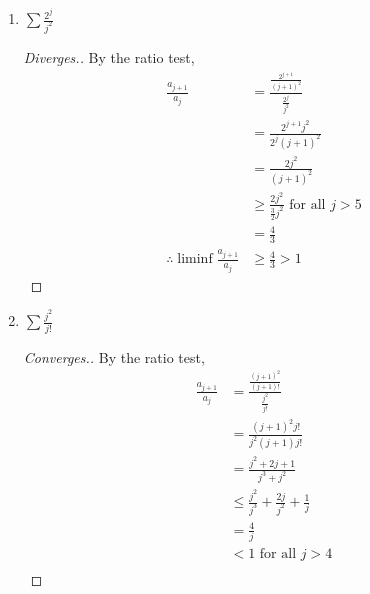 \documentclass{article}
\begin{document}
\begin{enumerate}
\begin{enumerate}
                  \item $\sum\frac{2^j}{j^2}$
                        \begin{proof}[Diverges.]
                              By the ratio test,
                              \begin{align*}
                                    \frac{a_{j+1}}{a_j}                    & = \frac{\frac{2^{j+1}}{(j+1)^2}}{\frac{2^j}{j^2}}        \\
                                                                           & = \frac{2^{j+1}j^2}{2^j(j+1)^2}                          \\
                                                                           & = \frac{2j^2}{(j+1)^2}                                   \\
                                                                           & \geq \frac{2j^2}{\frac{3}{2}j^2} \textrm{ for all $j>5$} \\
                                                                           & = \frac{4}{3}                                            \\
                                    \therefore \liminf \frac{a_{j+1}}{a_j} & \geq \frac{4}{3} > 1
                              \end{align*}
                        \end{proof}
                  \item $\sum\frac{j^2}{j!}$
                        \begin{proof}[Converges.]
                              By the ratio test,
                              \begin{align*}
                                    \frac{a_{j+1}}{a_j}                  & = \frac{\frac{(j+1)^2}{(j+1)!}}{\frac{j^2}{j!}} \\
                                                                         & = \frac{(j+1)^2j!}{j^2(j+1)j!}                  \\
                                                                         & = \frac{j^2+2j+1}{j^3+j^2}                      \\
                                                                         & \leq \frac{j^2}{j^3}+\frac{2j}{j^2}+\frac{1}{j} \\
                                                                         & = \frac{4}{j}                                   \\
                                                                         & < 1 \textrm{ for all $j>4$}                     \\

\end{align*}
\end{proof}
\end{enumerate}
\end{enumerate}
\end{document}
